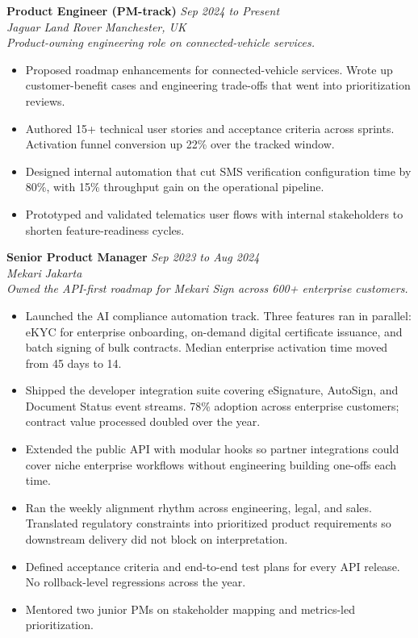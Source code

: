 \documentclass[11pt,a4paper]{article}
\begin{document}
\noindent\textbf{Product Engineer (PM-track)} \hfill \textit{Sep 2024 to Present}\\
\textit{Jaguar Land Rover} \hfill \textit{Manchester, UK}\\
\small\emph{Product-owning engineering role on connected-vehicle services.}\normalsize
\begin{itemize}
  \item Proposed roadmap enhancements for connected-vehicle services. Wrote up customer-benefit cases and engineering trade-offs that went into prioritization reviews.
  \item Authored 15+ technical user stories and acceptance criteria across sprints. Activation funnel conversion up 22\% over the tracked window.
  \item Designed internal automation that cut SMS verification configuration time by 80\%, with 15\% throughput gain on the operational pipeline.
  \item Prototyped and validated telematics user flows with internal stakeholders to shorten feature-readiness cycles.
\end{itemize}

\noindent\textbf{Senior Product Manager} \hfill \textit{Sep 2023 to Aug 2024}\\
\textit{Mekari} \hfill \textit{Jakarta}\\
\small\emph{Owned the API-first roadmap for Mekari Sign across 600+ enterprise customers.}\normalsize
\begin{itemize}
  \item Launched the AI compliance automation track. Three features ran in parallel: eKYC for enterprise onboarding, on-demand digital certificate issuance, and batch signing of bulk contracts. Median enterprise activation time moved from 45 days to 14.
  \item Shipped the developer integration suite covering eSignature, AutoSign, and Document Status event streams. 78\% adoption across enterprise customers; contract value processed doubled over the year.
  \item Extended the public API with modular hooks so partner integrations could cover niche enterprise workflows without engineering building one-offs each time.
  \item Ran the weekly alignment rhythm across engineering, legal, and sales. Translated regulatory constraints into prioritized product requirements so downstream delivery did not block on interpretation.
  \item Defined acceptance criteria and end-to-end test plans for every API release. No rollback-level regressions across the year.
  \item Mentored two junior PMs on stakeholder mapping and metrics-led prioritization.
\end{itemize}
\end{document}
